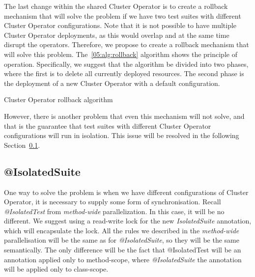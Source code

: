 The last change within the shared Cluster Operator is to create a rollback mechanism that will solve the problem if we have two test suites with different Cluster Operator configurations.
Note that it is not possible to have multiple Cluster Operator deployments, as this would overlap and at the same time disrupt the operators.
Therefore, we propose to create a rollback mechanism that will solve this problem.
The~\ref{05:alg:rollback} algorithm shows the principle of operation.
Specifically, we suggest that the algorithm be divided into two phases, where the first is to delete all currently deployed resources.
The second phase is the deployment of a new Cluster Operator with a default configuration.
\begin{algorithm}[H]
    \caption{Cluster Operator rollback algorithm}
    \label{05:alg:rollback}
    \begin{algorithmic}[1]
        \EndIf
        \EndIf
        \EndIf

        \State
    \end{algorithmic}
\end{algorithm}

However, there is another problem that even this mechanism will not solve, and that is the guarantee that test suites with different Cluster Operator configurations will run in isolation.
This issue will be resolved in the following Section~\ref{05:isolatedsuite}.

\subsection{@IsolatedSuite}
\label{05:isolatedsuite}

One way to solve the problem is when we have different configurations of Cluster Operator, it is necessary to supply some form of synchronisation.
Recall \emph{@IsolatedTest} from \emph{method-wide} parallelization.
In this case, it will be no different.
We suggest using a read-write lock for the new \emph{IsolatedSuite} annotation, which will encapsulate the lock.
All the rules we described in the \emph{method-wide} parallelisation will be the same as for \emph{@IsolatedSuite}, so they will be the same semantically.
The only difference will be the fact that @IsolatedTest will be an annotation applied only to method-scope, where \emph{@IsolatedSuite} the annotation will be applied only to class-scope.

